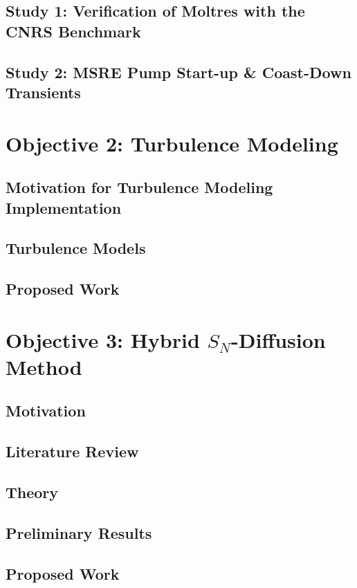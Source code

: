 \documentclass[9pt]{beamer}
\begin{document}
\subsection{Study 1: Verification of Moltres with the CNRS Benchmark}

\subsection{Study 2: MSRE Pump Start-up \& Coast-Down Transients}


\section{Objective 2: Turbulence Modeling}
\subsection{Motivation for Turbulence Modeling Implementation}

\subsection{Turbulence Models}

\subsection{Proposed Work}


\section{Objective 3: Hybrid $S_N$-Diffusion Method}
\subsection{Motivation}

\subsection{Literature Review}

\subsection{Theory}

\subsection{Preliminary Results}

\subsection{Proposed Work}

\end{document}
